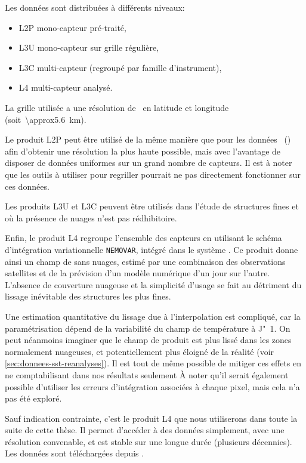 Les données sont distribuées à différents niveaux:
\begin{itemize}
  \item L2P mono-capteur pré-traité,
  \item L3U mono-capteur sur grille régulière,
  \item L3C multi-capteur (regroupé par famille d'instrument),
  \item L4 multi-capteur analysé.
\end{itemize}
La grille utilisée a une résolution de~ en latitude et longitude (soit~\qty{\approx5.6}{\km}).

Le produit L2P peut être utilisé de la même manière que pour les données ~() afin d'obtenir une résolution la plus haute possible, mais avec l'avantage de disposer de données uniformes sur un grand nombre de capteurs.
Il est à noter que les outils à utiliser pour regriller pourrait ne pas directement fonctionner sur ces données.

Les produits L3U et L3C peuvent être utilisés dans l'étude de structures fines et où la présence de nuages n'est pas rédhibitoire.

Enfin, le produit L4 regroupe l'ensemble des capteurs en utilisant le schéma d'intégration variationnelle \verb|NEMOVAR|, intégré dans le système  \parencite{good_2020}.
Ce produit donne ainsi un champ de  sans nuages, estimé par une combinaison des observations satellites et de la prévision d'un modèle numérique d'un jour sur l'autre.
L'absence de couverture nuageuse et la simplicité d'usage se fait au détriment du lissage inévitable des structures les plus fines.

Une estimation quantitative du lissage due à l'interpolation est compliqué, car la paramétrisation dépend de la variabilité du champ de température à J"~1.
On peut néanmoins imaginer que le champ de  produit est plus lissé dans les zones normalement nuageuses, et potentiellement plus éloigné de la réalité (voir \cref{sec:donnees-sst-reanalyses}).
Il est tout de même possible de mitiger ces effets en ne comptabilisant dans nos résultats seulement
À noter qu'il serait également possible d'utiliser les erreurs d'intégration associées à chaque pixel, mais cela n'a pas été exploré.

Sauf indication contrainte, c'est le produit L4 que nous utiliserons dans toute la suite de cette thèse.
Il permet d'accéder à des données  simplement, avec une résolution convenable, et est stable sur une longue durée (plusieurs décennies).
Les données sont téléchargées depuis .

